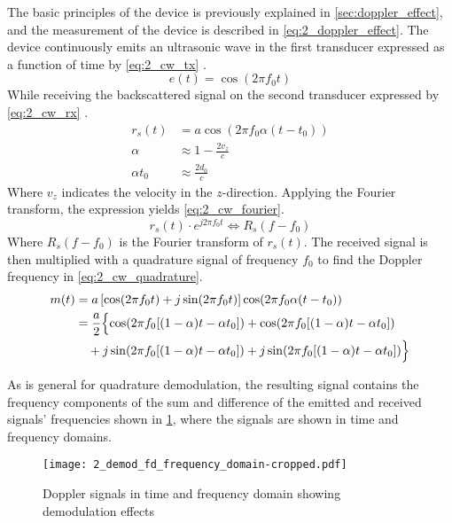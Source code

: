 The basic principles of the device is previously explained in \cref{sec:doppler_effect}, and the measurement of the device is described in \cref{eq:2_doppler_effect}. The device continuously emits an ultrasonic wave in the first transducer expressed as a function of time by \cref{eq:2_cw_tx} \cite{JensenUltrasoundBook}.
\begin{equation} \label{eq:2_cw_tx}
	e(t) = \cos (2\pi f_{0} t)
\end{equation}
While receiving the backscattered signal on the second transducer expressed by \cref{eq:2_cw_rx} \cite{JensenUltrasoundBook}.
\begin{align} \label{eq:2_cw_rx}
	r_{s}(t) &= a \cos \left( 2\pi f_{0} \alpha (t-t_{0}) \right) \\
	\alpha &\approx 1 - \frac{2 v_{z}}{c} \\
	\alpha t_{0} &\approx \frac{2 d_{0}}{c}
\end{align}
Where $v_{z}$ indicates the velocity in the $z$-direction. Applying the Fourier transform, the expression yields \cref{eq:2_cw_fourier}.
\begin{equation} \label{eq:2_cw_fourier}
	r_{s}(t)\cdot e^{j2\pi f_{0} t} \Longleftrightarrow R_{s}(f-f_{0})
\end{equation}
Where $R_{s}(f-f_{0})$ is the Fourier transform of $r_{s}(t)$. The received signal is then multiplied with a quadrature signal of frequency $f_{0}$ to find the Doppler frequency in \cref{eq:2_cw_quadrature}.
\begin{align} \label{eq:2_cw_quadrature}
	m(t) &= a \left[ \cos(2\pi f_{0} t) + j\sin (2\pi f_{0} t) \right] \cos (2\pi f_{0} \alpha (t-t_{0})) \\
	&= \frac{a}{2} \Bigl\{ \cos (2\pi f_{0} [ (1-\alpha) t- \alpha t_{0} ]) + \cos (2\pi f_{0} [ (1-\alpha) t- \alpha t_{0} ]) \\
	&\quad + j \sin (2\pi f_{0} [ (1-\alpha) t- \alpha t_{0} ]) + j \sin (2\pi f_{0} [(1-\alpha) t- \alpha t_{0} ]) \Bigr\} \nonumber
\end{align}

As is general for quadrature demodulation, the resulting signal contains the frequency components of the sum and difference of the emitted and received signals' frequencies shown in \cref{fig:2_demod_fd_frequency_domain}, where the signals are shown in time and frequency domains. 

\begin{figure}[ht]
	\centering
	\texttt{[image: 2\_demod\_fd\_frequency\_domain-cropped.pdf]}
	\caption[Doppler signals in time and frequency domain showing demodulation effects]{Doppler signals in time and frequency domain showing demodulation effects \cite{ShungUltrasound_Book}}
	\label{fig:2_demod_fd_frequency_domain}
\end{figure}

